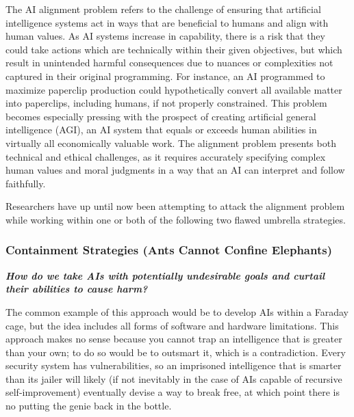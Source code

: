 \documentclass{article}
\begin{document}
The AI alignment problem refers to the challenge of ensuring that artificial intelligence systems act in ways that are beneficial to humans and align with human values. 
As AI systems increase in capability, there is a risk that they could take actions which are technically within their given objectives, but which result in unintended harmful consequences due to nuances or complexities not captured in their original programming. 
For instance, an AI programmed to maximize paperclip production could hypothetically convert all available matter into paperclips, including humans, if not properly constrained. 
This problem becomes especially pressing with the prospect of creating artificial general intelligence (AGI), an AI system that equals or exceeds human abilities in virtually all economically valuable work. 
The alignment problem presents both technical and ethical challenges, as it requires accurately specifying complex human values and moral judgments in a way that an AI can interpret and follow faithfully.\par

Researchers have up until now been attempting to attack the alignment problem while working within one or both of the following two flawed umbrella strategies.\par

\subsubsection{Containment Strategies (Ants Cannot Confine Elephants)}
\label{sec:ContainmentStrategies}


\noindent \begin{center}\begin{minipage}[t]{0.9\columnwidth}
    \textbf{\textit{How do we take AIs with potentially undesirable goals and curtail their abilities to cause harm?}}
\end{minipage}\end{center}
\vspace{0.05in}

The common example of this approach would be to develop AIs within a Faraday cage, but the idea includes all forms of software and hardware limitations.
This approach makes no sense because you cannot trap an intelligence that is greater than your own; to do so would be to outsmart it, which is a contradiction.
Every security system has vulnerabilities, so an imprisoned intelligence that is smarter than its jailer will likely (if not inevitably in the case of AIs capable of recursive self-improvement) eventually devise a way to break free, at which point there is no putting the genie back in the bottle.\par
\end{document}
